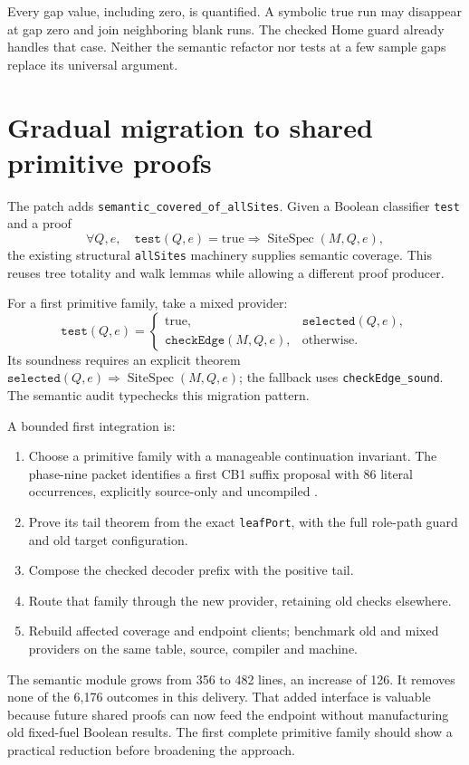 \documentclass[11pt,letterpaper]{article}
\newcommand{\Spec}{\operatorname{SiteSpec}}
\newcommand{\code}[1]{\texttt{#1}}
\begin{document}
Every gap value, including zero, is quantified. A symbolic true run may disappear
at gap zero and join neighboring blank runs. The checked Home guard already
handles that case. Neither the semantic refactor nor tests at a few sample
gaps replace its universal argument.

\section{Gradual migration to shared primitive proofs}

The patch adds \code{semantic\_covered\_of\_allSites}. Given a Boolean classifier
\code{test} and a proof
\[
 \forall Q,e,\quad\code{test}(Q,e)=\mathrm{true}
 \Longrightarrow\Spec(M,Q,e),
\]
the existing structural \code{allSites} machinery supplies semantic coverage.
This reuses tree totality and walk lemmas while allowing a different proof
producer.

For a first primitive family, take a mixed provider:
\[
 \code{test}(Q,e)=
 \begin{cases}
 \mathrm{true},&\code{selected}(Q,e),\\
 \code{checkEdge}(M,Q,e),&\text{otherwise}.
 \end{cases}
\]
Its soundness requires an explicit theorem
\(\code{selected}(Q,e)\Rightarrow\Spec(M,Q,e)\); the fallback uses
\code{checkEdge\_sound}. The semantic audit typechecks this migration pattern.

A bounded first integration is:
\begin{enumerate}
\item Choose a primitive family with a manageable continuation invariant.
The phase-nine packet identifies a first CB1 suffix proposal with 86 literal
occurrences, explicitly source-only and uncompiled \cite{phase9}.
\item Prove its tail theorem from the exact \code{leafPort}, with the full
role-path guard and old target configuration.
\item Compose the checked decoder prefix with the positive tail.
\item Route that family through the new provider, retaining old checks elsewhere.
\item Rebuild affected coverage and endpoint clients; benchmark old and mixed
providers on the same table, source, compiler and machine.
\end{enumerate}

The semantic module grows from 356 to 482 lines, an increase of 126. It removes
none of the 6,176 outcomes in this delivery. That added interface is valuable
because future shared proofs can now feed the endpoint without manufacturing
old fixed-fuel Boolean results. The first complete primitive family should show
a practical reduction before broadening the approach.
\end{document}
